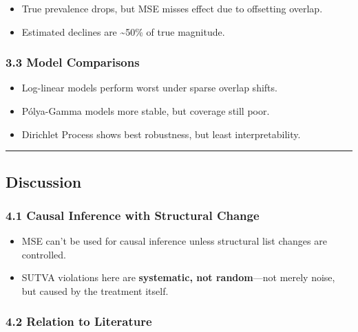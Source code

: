 \documentclass[
  12pt,
]{article}
\theoremstyle{plain}
\theoremstyle{definition}
\begin{document}
\begin{itemize}
\item
  True prevalence drops, but MSE misses effect due to offsetting
  overlap.
\item
  Estimated declines are \textasciitilde50\% of true magnitude.
\end{itemize}

\subsubsection{\texorpdfstring{\textbf{3.3 Model
Comparisons}}{3.3 Model Comparisons}}\label{model-comparisons}

\begin{itemize}
\item
  Log-linear models perform worst under sparse overlap shifts.
\item
  Pólya-Gamma models more stable, but coverage still poor.
\item
  Dirichlet Process shows best robustness, but least interpretability.
\end{itemize}

\begin{center}\rule{0.5\linewidth}{0.5pt}\end{center}

\subsection{Discussion}\label{discussion}

\subsubsection{\texorpdfstring{\textbf{4.1 Causal Inference with
Structural
Change}}{4.1 Causal Inference with Structural Change}}\label{causal-inference-with-structural-change}

\begin{itemize}
\item
  MSE can't be used for causal inference unless structural list changes
  are controlled.
\item
  SUTVA violations here are \textbf{systematic, not random}---not merely
  noise, but caused by the treatment itself.
\end{itemize}

\subsubsection{\texorpdfstring{\textbf{4.2 Relation to
Literature}}{4.2 Relation to Literature}}\label{relation-to-literature}
\end{document}

